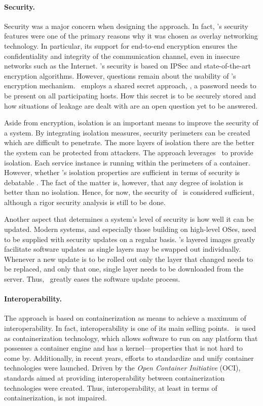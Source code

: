 \paragraph{Security.}
Security was a major concern when designing the approach. In fact, \weave 's security features were one of the primary reasons why it was chosen as overlay networking technology. In particular, its support for end-to-end encryption ensures the confidentiality and integrity of the communication channel, even in insecure networks such as the Internet. \wnet 's security is based on IPSec and state-of-the-art encryption algorithms. However, questions remain about the usability of \weave 's encryption mechanism. \weave\ employs a shared secret approach, \ie , a password needs to be present on all participating hosts. How this secret is to be securely stored and how situations of leakage are dealt with are an open question yet to be answered.

Aside from encryption, isolation is an important means to improve the security of a system. By integrating isolation measures, security perimeters can be created which are difficult to penetrate. The more layers of isolation there are the better the system can be protected from attackers. The approach leverages \docker\ to provide isolation. Each service instance is running within the perimeters of a container. However, whether \docker 's isolation properties are sufficient in terms of security is debatable \cite{xavier2013performance}. The fact of the matter is, however, that any degree of isolation is better than no isolation. Hence, for now, the security of \docker\ is considered sufficient, although a rigor security analysis is still to be done.

Another aspect that determines a system's level of security is how well it can be updated. Modern systems, and especially those building on high-level OSes, need to be supplied with security updates on a regular basis. \docker 's layered images greatly facilitate software updates as single layers may be swapped out individually. Whenever a new update is to be rolled out only the layer that changed needs to be replaced, and only that one, single layer needs to be downloaded from the server. Thus, \docker\ greatly eases the software update process.


\paragraph{Interoperability.}
The approach is based on containerization as means to achieve a maximum of interoperability. In fact, interoperability is one of its main selling points. \docker\ is used as containerization technology, which allows software to run on any platform that possesses a container engine and has a kernel---properties that is not hard to come by. Additionally, in recent years, efforts to standardize and unify container technologies were launched. Driven by the \emph{Open Container Initiative} (OCI), standards aimed at providing interoperability between containerization technologies were created. Thus, interoperability, at least in terms of containerization, is not impaired.

